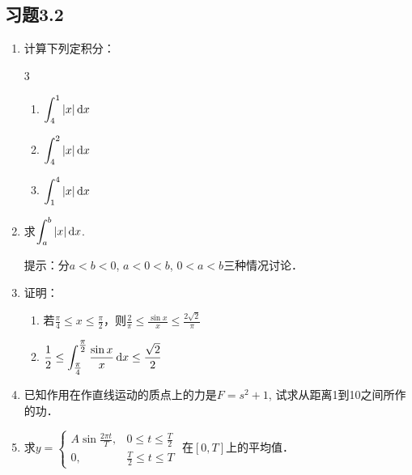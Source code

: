 \subsection*{习题3.2}
\begin{enumerate}
    \item 计算下列定积分：
\begin{multicols}{3}
\begin{enumerate}
    \item $\displaystyle\int^1_4 |x|\,{\rm d} x$
    \item $\displaystyle\int^2_4 |x|\,{\rm d} x$
    \item $\displaystyle\int^4_1 |x|\,{\rm d} x$
\end{enumerate}
\end{multicols}
\item 求$\displaystyle\int^b_a |x|\,{\rm d} x$.

提示：分$a<b<0$, $a<0<b$, $0<a<b$三种情况讨论．
\item 证明：
\begin{enumerate}
    \item 若$\frac{\pi}{4}\le x\le\frac{\pi}{2}$，则$\frac{2}{\pi}\le \frac{\sin x}{x}\le \frac{2\sqrt{2}}{\pi}$
    \item $\dfrac{1}{2}\le \displaystyle\int^{\tfrac{\pi}{2}}_{\tfrac{\pi}{4}}\dfrac{\sin x}{x}\,{\rm d} x\le \dfrac{\sqrt{2}}{2}$
\end{enumerate}
\item 已知作用在作直线运动的质点上的力是$F=s^2+1$, 试求从距离1到10之间所作的功．
\item 求$y=\begin{cases}
    A\sin\frac{2\pi t}{T}, & 0\le t\le \frac{T}{2}\\
    0,& \frac{T}{2}\le t\le T
\end{cases}$ 在$[0,T]$上的平均值．
\end{enumerate}